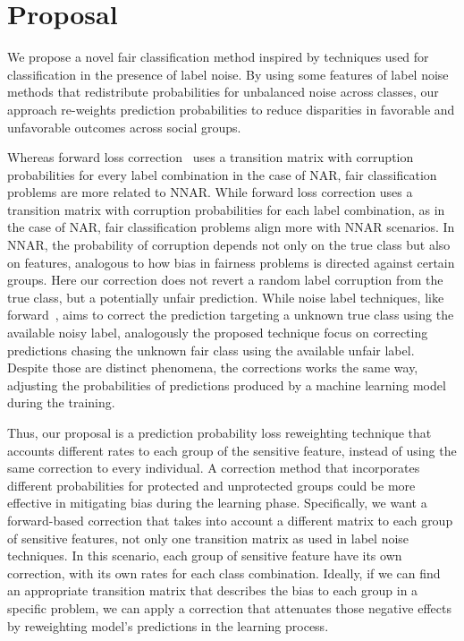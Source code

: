 \section{Proposal} \label{sec:proposal}

We propose a novel fair classification method inspired by techniques used for classification in the presence of label noise. By using some features of label noise methods that redistribute probabilities for unbalanced noise across classes, our approach re-weights prediction probabilities to reduce disparities in favorable and unfavorable outcomes across social groups.

Whereas forward loss correction~\citep{Patrini2017} uses a transition matrix with corruption probabilities for every label combination in the case of NAR, fair classification problems are more related to NNAR. While forward loss correction uses a transition matrix with corruption probabilities for each label combination, as in the case of NAR, fair classification problems align more with NNAR scenarios. In NNAR, the probability of corruption depends not only on the true class but also on features, analogous to how bias in fairness problems is directed against certain groups. Here our correction does not revert a random label corruption from the true class, but a potentially unfair prediction. While noise label techniques, like forward~\citep{Patrini2017}, aims to correct the prediction targeting a unknown true class using the available noisy label, analogously the proposed technique focus on correcting predictions chasing the unknown fair class using the available unfair label. Despite those are distinct phenomena, the corrections works the same way, adjusting the probabilities of predictions produced by a machine learning model during the training. 

Thus, our proposal is a prediction probability loss reweighting technique that accounts different rates to each group of the sensitive feature, instead of using the same correction to every individual. A correction method that incorporates different probabilities for protected and unprotected groups could be more effective in mitigating bias during the learning phase. Specifically, we want a forward-based correction that takes into account a different matrix to each group of sensitive features, not only one transition matrix as used in label noise techniques. In this scenario, each group of sensitive feature have its own correction, with its own rates for each class combination. Ideally, if we can find an appropriate transition matrix that describes the bias to each group in a specific problem, we can apply a correction that attenuates those negative effects by reweighting model's predictions in the learning process.

